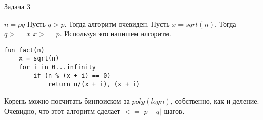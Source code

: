 \documentclass{article}
\begin{document}
\begin{center}
	Задача 3
\end{center}

$n = pq$
Пусть $q > p$. Тогда алгоритм очевиден. Пусть $x = sqrt(n)$. Тогда $q >= x$ $x >= p$. Используя это напишем алгоритм.

\begin{lstlisting}
fun fact(n) 
    x = sqrt(n)
    for i in 0...infinity
        if (n % (x + i) == 0)
            return n/(x + i), (x + i)
\end{lstlisting}

Корень можно посчитать бинпоиском за $poly(log n)$, собственно, как и деление.
Очевидно, что этот алгоритм сделает $<=|p - q|$ шагов. 
\end{document}
